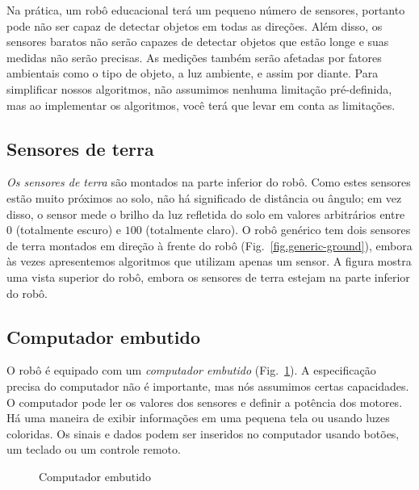 Na prática, um robô educacional terá um pequeno número de sensores, portanto pode não ser capaz de detectar objetos em todas as direções. Além disso, os sensores baratos não serão capazes de detectar objetos que estão longe e suas medidas não serão precisas. As medições também serão afetadas por fatores ambientais como o tipo de objeto, a luz ambiente, e assim por diante. Para simplificar nossos algoritmos, não assumimos nenhuma limitação pré-definida, mas ao implementar os algoritmos, você terá que levar em conta as limitações.

\subsection{Sensores de terra}

\emph{Os sensores de terra} são montados na parte inferior do robô. Como estes sensores estão muito próximos ao solo, não há significado de distância ou ângulo; em vez disso, o sensor mede o brilho da luz refletida do solo em valores arbitrários entre $0$ (totalmente escuro) e $100$ (totalmente claro). O robô genérico tem dois sensores de terra montados em direção à frente do robô (Fig.~\ref{fig.generic-ground}), embora às vezes apresentemos algoritmos que utilizam apenas um sensor. A figura mostra uma vista superior do robô, embora os sensores de terra estejam na parte inferior do robô.

\subsection{Computador embutido}\label{s.embedded}

O robô é equipado com um \emph{computador embutido} (Fig.~\ref{fig.computer}). A especificação precisa do computador não é importante, mas nós assumimos certas capacidades. O computador pode ler os valores dos sensores e definir a potência dos motores. Há uma maneira de exibir informações em uma pequena tela ou usando luzes coloridas. Os sinais e dados podem ser inseridos no computador usando botões, um teclado ou um controle remoto.

\begin{figure}
\begin{center}
\caption{Computador embutido}\label{fig.computer}
\end{center}
\end{figure}

